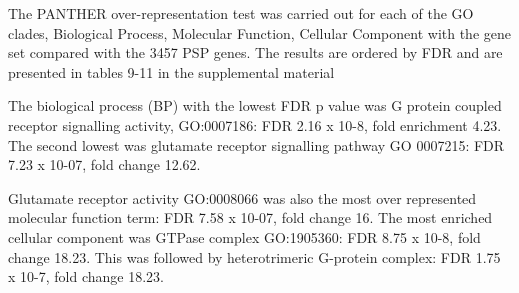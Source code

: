 The PANTHER over-representation test was carried out for each of the GO clades, Biological Process, Molecular Function, Cellular Component with the gene set compared with the 3457 PSP genes. The results are ordered by FDR and are presented in tables 9-11 in the supplemental material 

The biological process (BP) with the lowest FDR p value was G protein coupled receptor signalling activity, GO:0007186: FDR 2.16 x 10-8, fold enrichment 4.23. The second lowest was glutamate receptor signalling pathway GO 0007215: FDR 7.23 x 10-07, fold change 12.62.

Glutamate receptor activity GO:0008066 was also the most over represented molecular function term: FDR 7.58 x 10-07, fold change 16. The most enriched cellular component was GTPase complex GO:1905360: FDR 8.75 x 10-8, fold change 18.23. This was followed by heterotrimeric G-protein complex: FDR 1.75 x 10-7, fold change 18.23.

